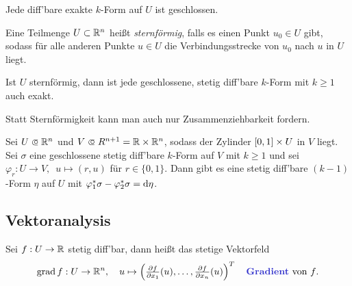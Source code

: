 \documentclass{cheat-sheet}
\DeclareMathOperator{\grad}{grad} %
\theoremstyle{definition}
\begin{document}
\begin{beobachtung}
  Jede diff'bare exakte $k$-Form auf $U$ ist geschlossen.
\end{beobachtung}


\begin{defn}
  Eine Teilmenge $U \subset \mathbb{R}^n$ heißt \emph{sternförmig}, falls es einen Punkt $u_0 \in U$ gibt, sodass für alle anderen Punkte $u \in U$ die Verbindungsstrecke von $u_0$ nach $u$ in $U$ liegt.
\end{defn}

\begin{lem}
  Ist $U$ sternförmig, dann ist jede geschlossene, stetig diff'bare $k$-Form mit $k \geq 1$ auch exakt.
\end{lem}

\begin{bem}
  Statt Sternförmigkeit kann man auch nur Zusammenziehbarkeit fordern.
\end{bem}


\begin{samepage}

\begin{lem}
  Sei $U \opn \R^n$ und $V \opn R^{n{+}1} = \R \times \R^n$, sodass der Zylinder $\left[ 0, 1 \right] \times U$ in $V$ liegt. Sei $\sigma$ eine geschlossene stetig diff'bare $k$-Form auf $V$ mit $k \geq 1$ und sei $\varphi_r : U \to V, \enspace u \mapsto (r, u)$ für $r \in \{ 0, 1 \}$.
  Dann gibt es eine stetig diff'bare $(k{-}1)$-Form $\eta$ auf $U$ mit $\varphi_1^* \sigma - \varphi_2^* \sigma = \mathrm{d} \eta$.
\end{lem}


\subsection{Vektoranalysis}

\end{samepage}


\begin{defn}
  Sei $f : U \to \mathbb{R}$ stetig diff'bar, dann heißt das stetige Vektorfeld
  \[
    \grad f : U \to \R^n, \quad
    u \mapsto \left( \tfrac{\partial f}{\partial x_1} (u), \ldots, \tfrac{\partial f}{\partial x_n} (u) \right)^T
    \quad \text{\emph{Gradient} von $f$.}
  \]
\end{defn}
\end{document}

